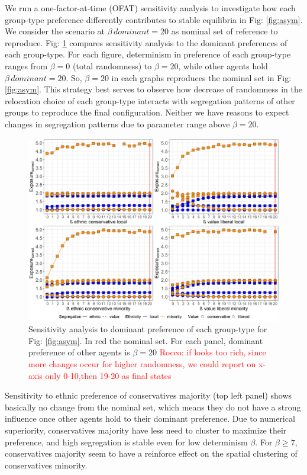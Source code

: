 \documentclass{article}
\newcommand{\rocco}[1]{{\textcolor{red}{Rocco: #1}}} %
\begin{document}
We run a one-factor-at-time (OFAT) sensitivity analysis \autocite{broeke2016sensitivity} to investigate how each group-type preference differently contributes to stable equilibria in Fig: \ref{fig:asym}. We consider the scenario at $\beta \, dominant = 20$ as nominal set of reference to reproduce. Fig: \ref{fig:sa_asym} compares sensitivity analysis to the dominant preferences of each group-type. For each figure, determinism in preference of each group-type ranges from $\beta = 0$ (total randomness) to $\beta = 20$, while other agents hold $\beta \, dominant = 20$. So, $\beta = 20$ in each graphs reproduces the nominal set in Fig: \ref{fig:asym}. This strategy best serves to observe how decrease of randomness in the relocation choice of each group-type interacts with segregation patterns of other groups to reproduce the final configuration. Neither we have reasons to expect changes in segregation patterns due to parameter range above $\beta = 20$. 

\begin{figure}[H]
    \centering
    \includegraphics[scale=0.5]{material/figures/sa_asym_bt.jpg}
    \caption{Sensitivity analysis to dominant preference of each group-type for Fig: \ref{fig:asym}. In red the nominal set. For each panel, dominant preference of other agents is $\beta = 20$ \rocco{if looks too rich, since more changes occur for higher randomness, we could report on x-axis only 0-10,then 19-20 as final states}}
    \label{fig:sa_asym}
\end{figure} %

Sensitivity to ethnic preference of conservatives majority (top left panel) shows basically no change from the nominal set, which means they do not have a strong influence once other agents hold to their dominant preference. Due to numerical superiority, conservatives majority have less need to cluster to maximize their preference, and high segregation is stable even for low determinism $\beta$. For $\beta \geq 7$, conservatives majority seem to have a reinforce effect on the spatial clustering of conservatives minority.
\end{document}
